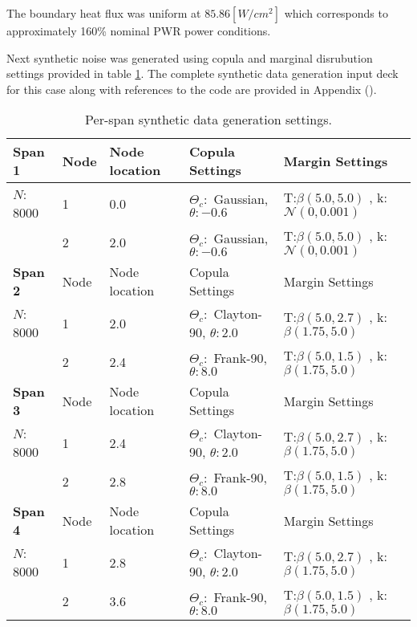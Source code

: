 The boundary heat flux was uniform at $85.86 [W/cm^2]$ which corresponds to approximately 160\% nominal PWR power conditions.

Next synthetic noise was generated using copula and marginal disrubution settings provided in table \ref{tab:synth_settings}. The complete synthetic data generation input deck for this case along with references to the code are provided in Appendix ().

\begin{table}[h]
    \begin{center}
        \caption{Per-span synthetic data generation settings.}
        \begin{tabular}{|l|l|l|l|l|}
            \hline
            \bf Span 1 & Node & Node location & Copula Settings  & Margin Settings \\
            \hline
            $N$: 8000  & 1  & 0.0 & $\Theta_c:$ Gaussian, $\theta:-0.6$ &  T:$\beta(5.0, 5.0)$ , k: $\mathcal{N}(0, 0.001)$ \\
                   & 2  & 2.0 & $\Theta_c:$ Gaussian, $\theta:-0.6$ &  T:$\beta(5.0, 5.0)$ , k: $\mathcal{N}(0, 0.001)$   \\
            \hline \hline
            \bf Span 2 & Node & Node location & Copula Settings  & Margin Settings \\
            \hline
             $N$: 8000 & 1  & 2.0 & $\Theta_c:$ Clayton-90, $\theta: 2.0$ &  T:$\beta(5.0, 2.7)$ , k: $\beta(1.75, 5.0)$ \\
            & 2  & 2.4 & $\Theta_c:$ Frank-90, $\theta: 8.0$ &  T:$\beta(5.0, 1.5)$ , k: $\beta(1.75, 5.0)$   \\
            \hline \hline
            \bf Span 3 & Node & Node location & Copula Settings  & Margin Settings \\
            \hline
             $N$: 8000 & 1  & 2.4 & $\Theta_c:$ Clayton-90, $\theta: 2.0$ &  T:$\beta(5.0, 2.7)$ , k: $\beta(1.75, 5.0)$ \\
            & 2  & 2.8 & $\Theta_c:$ Frank-90, $\theta: 8.0$ &  T:$\beta(5.0, 1.5)$ , k: $\beta(1.75, 5.0)$   \\
            \hline \hline
            \bf Span 4 & Node & Node location & Copula Settings  & Margin Settings \\
            \hline
            $N$: 8000 & 1  & 2.8 & $\Theta_c:$ Clayton-90, $\theta: 2.0$ &  T:$\beta(5.0, 2.7)$ , k: $\beta(1.75, 5.0)$ \\
            & 2  & 3.6 & $\Theta_c:$ Frank-90, $\theta: 8.0$ &  T:$\beta(5.0, 1.5)$ , k: $\beta(1.75, 5.0)$   \\
            \hline
        \end{tabular}
        \label{tab:synth_settings}
    \end{center}
\end{table}

